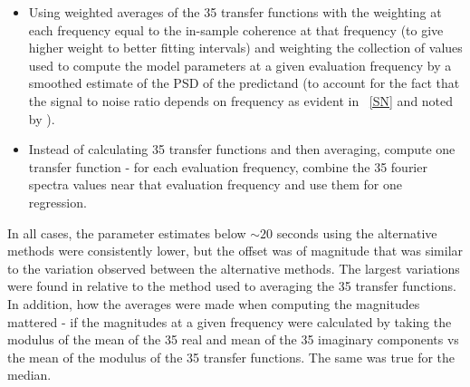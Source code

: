 \documentclass[draft,linenumbers]{agujournal2018}
\begin{document}
\begin{itemize}
\item Using weighted averages of the 35 transfer functions with the weighting at each frequency equal to the in-sample coherence at that frequency (to give higher weight to better fitting intervals) and weighting the collection of values used to compute the model parameters at a given evaluation frequency by a smoothed estimate of the PSD of the predictand (to account for the fact that the signal to noise ratio depends on frequency as evident in ~\ref{SN} and noted by \citep{Egbert1997}).

\item Instead of calculating 35 transfer functions and then averaging, compute one transfer function - for each evaluation frequency, combine the 35 fourier spectra values near that evaluation frequency and use them for one regression.  
\end{itemize}

In all cases, the parameter estimates below $\sim 20$ seconds using the alternative methods were consistently lower, but the offset was of magnitude that was similar to the variation observed between the alternative methods. The largest variations were found in relative to the method used to averaging the 35 transfer functions. In addition, how the averages were made when computing the magnitudes mattered - if the magnitudes at a given frequency were calculated by taking the modulus of the mean of the 35 real and mean of the 35 imaginary components vs the mean of the modulus of the 35 transfer functions. The same was true for the median.




\end{document}
